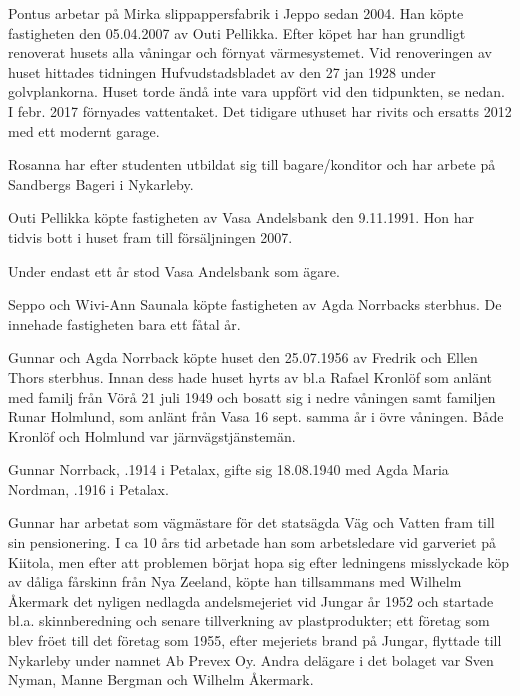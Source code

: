 Pontus arbetar på Mirka slippappersfabrik i Jeppo sedan 2004. Han köpte fastigheten den 05.04.2007 av Outi Pellikka. Efter köpet har han grundligt renoverat husets alla våningar och förnyat värmesystemet. Vid renoveringen av huset hittades tidningen Hufvudstadsbladet av	den 27 jan 1928 under golvplankorna. Huset torde ändå inte vara	uppfört vid den tidpunkten, se nedan. I febr. 2017 förnyades vattentaket. Det tidigare uthuset har rivits och ersatts 2012 med ett modernt garage.

Rosanna har efter studenten utbildat sig till bagare/konditor och	har arbete på Sandbergs Bageri i Nykarleby.



Outi Pellikka köpte fastigheten av Vasa Andelsbank den 9.11.1991. Hon har tidvis bott i huset fram till försäljningen 2007.\jhvspace{}


Under endast ett år stod Vasa Andelsbank som ägare.\jhvspace{}


Seppo och Wivi-Ann Saunala köpte fastigheten av Agda Norrbacks sterbhus. De innehade fastigheten bara ett fåtal år.\jhvspace{}


Gunnar och Agda Norrback köpte huset den 25.07.1956 av Fredrik och Ellen Thors sterbhus. Innan dess hade huset hyrts av bl.a Rafael Kronlöf som anlänt med familj från Vörå 21 juli 1949 och bosatt sig i	nedre våningen samt familjen Runar Holmlund, som anlänt från Vasa 16 sept. samma år i övre våningen. Både Kronlöf och Holmlund var järnvägstjänstemän.

Gunnar Norrback, .1914 i Petalax, gifte sig 18.08.1940 med Agda Maria Nordman, .1916 i Petalax.
\begin{jhchildren}
  \item {}
  \item {}
\end{jhchildren}

Gunnar har arbetat som vägmästare för det statsägda Väg och Vatten fram till sin pensionering. I ca 10 års tid arbetade han som arbetsledare vid garveriet på Kiitola, men efter att problemen börjat hopa sig efter ledningens misslyckade köp av dåliga fårskinn från Nya Zeeland, köpte han tillsammans med Wilhelm Åkermark det nyligen nedlagda andelsmejeriet vid Jungar år 1952 och startade bl.a. skinnberedning och senare tillverkning av plastprodukter; ett företag som blev fröet till det företag som 1955, efter mejeriets brand på Jungar, flyttade till Nykarleby	under namnet  Ab Prevex Oy. Andra delägare i det bolaget var Sven	Nyman, Manne Bergman och Wilhelm Åkermark.

